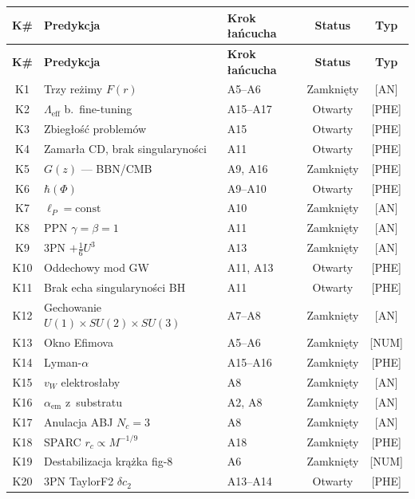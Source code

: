 \begin{center}
\small
\begin{longtable}{@{}cllcc@{}}
\toprule
\textbf{K\#} & \textbf{Predykcja} & \textbf{Krok \l{}a\'ncucha}
  & \textbf{Status} & \textbf{Typ} \\
\midrule
\endfirsthead
\toprule
\textbf{K\#} & \textbf{Predykcja} & \textbf{Krok \l{}a\'ncucha}
  & \textbf{Status} & \textbf{Typ} \\
\midrule
\endhead
\bottomrule
\endlastfoot
K1  & Trzy re\.zimy $F(r)$          & A5--A6          & Zamkni\k{e}ty & [AN] \\
K2  & $\Lambda_{\mathrm{eff}}$ b.\ fine-tuning & A15--A17 & Otwarty & [PHE] \\
K3  & Zbieg\l{}o\'s\'c problem\'ow   & A15             & Otwarty  & [PHE] \\
K4  & Zamar\l{}a CD, brak singularyno\'sci & A11       & Otwarty  & [PHE] \\
K5  & $G(z)$ --- BBN/CMB             & A9, A16         & Zamkni\k{e}ty & [PHE] \\
K6  & $\hbar(\Phi)$                  & A9--A10         & Otwarty  & [PHE] \\
K7  & $\ell_P = \mathrm{const}$      & A10             & Zamkni\k{e}ty & [AN] \\
K8  & PPN $\gamma = \beta = 1$       & A11             & Zamkni\k{e}ty & [AN] \\
K9  & 3PN $+\tfrac{1}{6}U^3$        & A13             & Zamkni\k{e}ty & [AN] \\
K10 & Oddechowy mod GW               & A11, A13        & Otwarty  & [PHE] \\
K11 & Brak echa singularyno\'sci BH  & A11             & Otwarty  & [PHE] \\
K12 & Gechowanie $U(1)\times SU(2)\times SU(3)$ & A7--A8 & Zamkni\k{e}ty & [AN] \\
K13 & Okno Efimova                   & A5--A6          & Zamkni\k{e}ty & [NUM] \\
K14 & Lyman-$\alpha$                 & A15--A16        & Zamkni\k{e}ty & [PHE] \\
K15 & $v_W$ elektros\l{}aby          & A8              & Zamkni\k{e}ty & [AN] \\
K16 & $\alpha_{\mathrm{em}}$ z~substratu & A2, A8      & Zamkni\k{e}ty & [AN] \\
K17 & Anulacja ABJ $N_c = 3$         & A8              & Zamkni\k{e}ty & [AN] \\
K18 & SPARC $r_c \propto M^{-1/9}$   & A18             & Zamkni\k{e}ty & [PHE] \\
K19 & Destabilizacja kr\k{a}\.zka fig-8 & A6          & Zamkni\k{e}ty & [NUM] \\
K20 & 3PN TaylorF2 $\delta c_2$      & A13--A14        & Otwarty  & [PHE] \\
\end{longtable}
\end{center}

